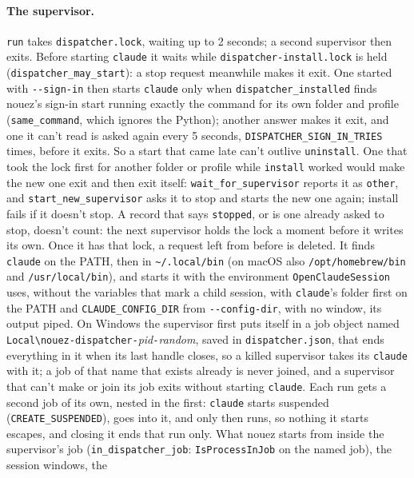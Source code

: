 \documentclass[10pt,a4paper]{article}
\newcommand{\code}[1]{\texttt{#1}}
\begin{document}
\paragraph{The supervisor.} \code{run} takes \code{dispatcher.lock}, waiting up to 2 seconds; a
second supervisor then exits. Before starting \code{claude} it waits while
\code{dispatcher-install.lock} is held (\code{dispatcher\_may\_start}): a stop request meanwhile
makes it exit. One started with \code{-{}-sign-in} then starts \code{claude} only when
\code{dispatcher\_installed} finds nouez's sign-in start running exactly the command for its own
folder and profile (\code{same\_command}, which ignores the Python); another answer makes it exit,
and one it can't read is asked again every 5 seconds, \code{DISPATCHER\_SIGN\_IN\_TRIES} times, before
it exits. So a start that came late can't outlive \code{uninstall}. One that took the lock first
for another folder or profile while \code{install} worked would make the new one exit and then
exit itself: \code{wait\_for\_supervisor} reports it as \code{other}, and
\code{start\_new\_supervisor} asks it to stop and starts the new one again; install fails if
it doesn't stop. A record that says \code{stopped}, or is one already asked to stop, doesn't
count: the next supervisor holds the lock a moment before it writes its own.
Once it has that lock, a request left from before is deleted. It finds \code{claude} on the PATH, then in \code{\textasciitilde/.local/bin}
(on macOS also \code{/opt/homebrew/bin} and \code{/usr/local/bin}), and starts it with the
environment \code{OpenClaudeSession} uses, without the variables that mark a child session,
with \code{claude}'s folder first on the PATH and \code{CLAUDE\_CONFIG\_DIR} from
\code{-{}-config-dir}, with no window, its output piped. On Windows the supervisor first puts
itself in a job object named \code{Local\textbackslash nouez-dispatcher-}\textit{pid}\code{-}\textit{random},
saved in \code{dispatcher.json}, that ends everything in it when its last handle closes, so a
killed supervisor takes its \code{claude} with it; a job of that name that exists already is never
joined, and a supervisor that can't make or join its job exits without starting \code{claude}. Each run gets a second job of its own, nested in the first: \code{claude} starts suspended
(\code{CREATE\_SUSPENDED}), goes into it, and only then runs, so nothing it starts escapes, and
closing it ends that run only. What nouez starts from inside the supervisor's job
(\code{in\_dispatcher\_job}: \code{IsProcessInJob} on the named job), the session windows, the
\end{document}

